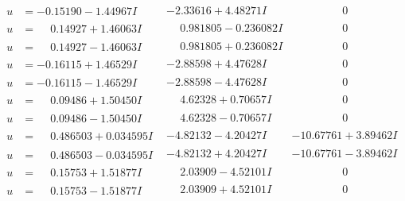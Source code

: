 \documentclass[1p]{elsarticle_modified}
\theoremstyle{definition}
\begin{document}
$$\begin{array}{c|c|c}
\begin{aligned}
u &= -0.15190 - 1.44967 I\end{aligned}
 & -2.33616 + 4.48271 I & \phantom{-0.000000 } 0 \\ \hline\begin{aligned}
u &= \phantom{-}0.14927 + 1.46063 I\end{aligned}
 & \phantom{-}0.981805 - 0.236082 I & \phantom{-0.000000 } 0 \\ \hline\begin{aligned}
u &= \phantom{-}0.14927 - 1.46063 I\end{aligned}
 & \phantom{-}0.981805 + 0.236082 I & \phantom{-0.000000 } 0 \\ \hline\begin{aligned}
u &= -0.16115 + 1.46529 I\end{aligned}
 & -2.88598 + 4.47628 I & \phantom{-0.000000 } 0 \\ \hline\begin{aligned}
u &= -0.16115 - 1.46529 I\end{aligned}
 & -2.88598 - 4.47628 I & \phantom{-0.000000 } 0 \\ \hline\begin{aligned}
u &= \phantom{-}0.09486 + 1.50450 I\end{aligned}
 & \phantom{-}4.62328 + 0.70657 I & \phantom{-0.000000 } 0 \\ \hline\begin{aligned}
u &= \phantom{-}0.09486 - 1.50450 I\end{aligned}
 & \phantom{-}4.62328 - 0.70657 I & \phantom{-0.000000 } 0 \\ \hline\begin{aligned}
u &= \phantom{-}0.486503 + 0.034595 I\end{aligned}
 & -4.82132 - 4.20427 I & -10.67761 + 3.89462 I \\ \hline\begin{aligned}
u &= \phantom{-}0.486503 - 0.034595 I\end{aligned}
 & -4.82132 + 4.20427 I & -10.67761 - 3.89462 I \\ \hline\begin{aligned}
u &= \phantom{-}0.15753 + 1.51877 I\end{aligned}
 & \phantom{-}2.03909 - 4.52101 I & \phantom{-0.000000 } 0 \\ \hline\begin{aligned}
u &= \phantom{-}0.15753 - 1.51877 I\end{aligned}
 & \phantom{-}2.03909 + 4.52101 I & \phantom{-0.000000 } 0 \\ \hline\begin{aligned}

\end{aligned}
\end{array}$$
\end{document}
